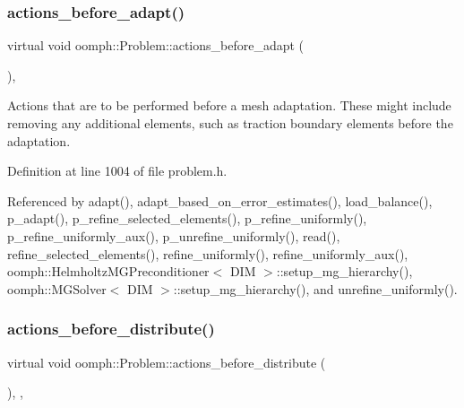 \subsubsection{\texorpdfstring{actions\+\_\+before\+\_\+adapt()}{actions\_before\_adapt()}}
{\footnotesize\ttfamily virtual void oomph\+::\+Problem\+::actions\+\_\+before\+\_\+adapt (\begin{DoxyParamCaption}{ }\end{DoxyParamCaption})\hspace{0.3cm}{\ttfamily [inline]}, {\ttfamily [virtual]}}



Actions that are to be performed before a mesh adaptation. These might include removing any additional elements, such as traction boundary elements before the adaptation. 



Definition at line 1004 of file problem.\+h.



Referenced by adapt(), adapt\+\_\+based\+\_\+on\+\_\+error\+\_\+estimates(), load\+\_\+balance(), p\+\_\+adapt(), p\+\_\+refine\+\_\+selected\+\_\+elements(), p\+\_\+refine\+\_\+uniformly(), p\+\_\+refine\+\_\+uniformly\+\_\+aux(), p\+\_\+unrefine\+\_\+uniformly(), read(), refine\+\_\+selected\+\_\+elements(), refine\+\_\+uniformly(), refine\+\_\+uniformly\+\_\+aux(), oomph\+::\+Helmholtz\+M\+G\+Preconditioner$<$ D\+I\+M $>$\+::setup\+\_\+mg\+\_\+hierarchy(), oomph\+::\+M\+G\+Solver$<$ D\+I\+M $>$\+::setup\+\_\+mg\+\_\+hierarchy(), and unrefine\+\_\+uniformly().

\mbox{\label{classoomph_1_1Problem_a1d1280f442f9352a614bada21324456d}} 
\subsubsection{\texorpdfstring{actions\+\_\+before\+\_\+distribute()}{actions\_before\_distribute()}}
{\footnotesize\ttfamily virtual void oomph\+::\+Problem\+::actions\+\_\+before\+\_\+distribute (\begin{DoxyParamCaption}{ }\end{DoxyParamCaption})\hspace{0.3cm}{\ttfamily [inline]}, {\ttfamily [protected]}, {\ttfamily [virtual]}}



